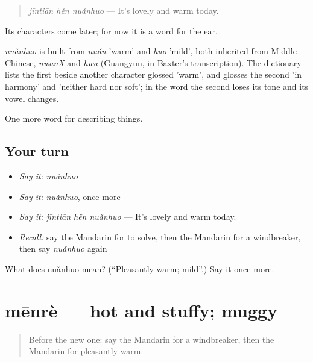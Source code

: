 \begin{quote}
\emph{jīntiān hěn nuǎnhuo} — It's lovely and warm today.
\end{quote}

Its characters come later; for now it is a word for the ear.

\begin{cousinweb}
\emph{nuǎnhuo} is built from \emph{nuǎn} 'warm' and \emph{huo} 'mild', both inherited from Middle Chinese, \emph{nwanX} and \emph{hwa} (Guangyun, in Baxter's transcription). The dictionary lists the first beside another character glossed 'warm', and glosses the second 'in harmony' and 'neither hard nor soft'; in the word the second loses its tone and its vowel changes.
\end{cousinweb}

\begin{grammarlens}[title={What you've built}]
One more word for describing things.
\end{grammarlens}

\subsection*{Your turn}
\begin{itemize}
\raggedright
  \item \emph{Say it:} \emph{nuǎnhuo}
  \item \emph{Say it:} \emph{nuǎnhuo}, once more
  \item \emph{Say it:} \emph{jīntiān hěn nuǎnhuo} — It's lovely and warm today.
  \item \emph{Recall:} say the Mandarin for to solve, then the Mandarin for a windbreaker, then say \emph{nuǎnhuo} again
\end{itemize}

\begin{tcolorbox}[breakable,colback=teal!4,colframe=teal!35!black,title={Before you move on}]
What does nuǎnhuo mean? (\textquotedblleft{}Pleasantly warm; mild\textquotedblright{}.) Say it once more.
\end{tcolorbox}
\section[mēnrè]{mēnrè — hot and stuffy; muggy}

\label{lesson:ZH-C218-menre}



\begin{quote}
Before the new one: say the Mandarin for a windbreaker, then the Mandarin for pleasantly warm.
\end{quote}

